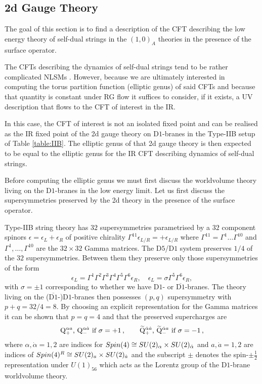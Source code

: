 \documentclass[main.tex]{subfiles}
\begin{document}
\subsection{2d Gauge Theory}
The goal of this section is to find a description of the CFT describing the low energy theory of self-dual strings in the $(1,0)_A$ theories in the presence of the surface operator. 

The CFTs describing the dynamics of self-dual strings tend to be rather complicated NLSMs \cite{del2018universal}. However, because we are ultimately interested in computing the torus partition function (elliptic genus) of said CFTs and because that quantity is constant under RG flow it suffices to consider, if it exists, a UV description that flows to the CFT of interest in the IR.

In this case, the CFT of interest is not an isolated fixed point and can be realised as the IR fixed point of the 2d gauge theory on D$1$-branes in the Type-IIB setup of Table \ref{table:IIB}. The elliptic genus of that 2d gauge theory is then expected to be equal to the elliptic genus for the IR CFT describing dynamics of self-dual strings.

Before computing the elliptic genus we must first discuss the worldvolume theory living on the D$1$-branes in the low energy limit. Let us first discuss the supersymmetries preserved by the 2d theory in the presence of the surface operator. 

Type-IIB string theory has $32$ supersymmetries parametrised by a $32$ component spinors $\epsilon=\epsilon_L+\epsilon_R$ of positive chirality $\Gamma^{11}\mathcal{\epsilon}_{L/R}=+\mathcal{\epsilon}_{L/R}$ where $\Gamma^{11}=\Gamma^1\dots\Gamma^{10}$ and $\Gamma^1,\dots,\Gamma^{10}$ are the $32\times32$ Gamma matrices.
The D$5$/D$1$ system preserves $1/4$ of the $32$ supersymmetries. Between them they preserve only those supersymmetries of the form
\begin{equation}
\epsilon_L=\Gamma^1\Gamma^2\Gamma^3\Gamma^4\Gamma^5\Gamma^6\epsilon_R,\quad \epsilon_L=\sigma\Gamma^5\Gamma^6\epsilon_R,
\end{equation} 
with $\sigma=\pm1$ corresponding to whether we have D$1$- or $\overline{\text{D$1$}}$-branes. The theory living on the ($\overline{\text{D$1$}}$-)D$1$-branes then possesses $(p,q)$ supersymmetry with $p+q=32/4=8$. By choosing an explicit representation for the Gamma matrices it can be shown that $p=q=4$ and that the preserved supercharges are 
\begin{equation}
\text{$\mathrm{Q}^{\alpha a}_{+}$, $\mathrm{Q}^{\alpha \dot a}_{-}$ if $\sigma=+1$}\,,\qquad\text{$\widetilde{\mathrm{Q}}^{\dot\alpha\dot a}_{+}$, $\widetilde{\mathrm{Q}}^{\dot\alpha a}_{-}$ if $\sigma=-1$}\,,
\end{equation}
where $\alpha,\dot{\alpha}=1,2$ are indices for $Spin(4)\cong SU(2)_{\alpha}\times SU(2)_{\dot\alpha}$ and $a,\dot a=1,2$ are indices of $Spin(4)^R\cong SU(2)_{a}\times SU(2)_{\dot a}$ and the subscript $\pm$ denotes the spin-$\pm\frac{1}{2}$ representation under $U(1)_{56}$ which acts as the Lorentz group of the D$1$-brane worldvolume theory.
\end{document}
